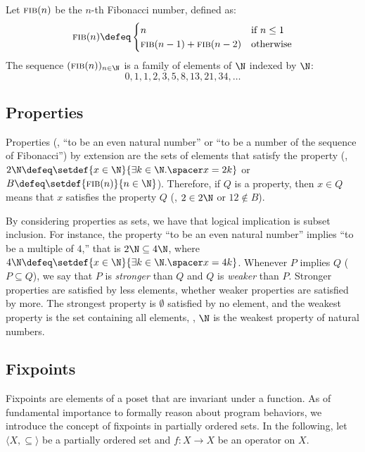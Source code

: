 \begin{example}
  Let $\textsc{fib}(n)$ be the $n$-th Fibonacci number, defined as:
  \begin{align*}
    \textsc{fib}(n) \defeq \begin{cases}
      n & \text{if } n \le 1 \\
      \textsc{fib}(n-1) + \textsc{fib}(n-2) & \text{otherwise}
    \end{cases}
  \end{align*}
  The sequence $(\textsc{fib}(n))_{n\in\N}$ is a family of elements of $\N$ indexed by $\N$:
  \[ 0, 1, 1, 2, 3, 5, 8, 13, 21, 34, \ldots \]
\end{example}

\subsection{Properties}

Properties (\eg, ``to be an even natural number'' or ``to be a number of the sequence of Fibonacci'') by extension are the sets of elements that satisfy the property (\eg, $2\N \defeq \setdef{x \in \N}{\exists k \in \N.\spacer x = 2k}$ or $B \defeq \setdef{\textsc{fib}(n)}{n\in\N}$). Therefore, if $Q$ is a property, then $x \in Q$ means that $x$ satisfies the property $Q$ (\eg, $2 \in 2\N$ or $12 \notin B$).

By considering properties as sets, we have that logical implication is subset inclusion. For instance, the property ``to be an even natural number'' implies ``to be a multiple of $4$,'' that is $2\N \subseteq 4\N$, where $4\N \defeq \setdef{x \in \N}{\exists k \in \N.\spacer x = 4k}$.
Whenever $P$ implies $Q$ ($P \subseteq Q$), we say that $P$ is \emph{stronger} than $Q$ and $Q$ is \emph{weaker} than $P$.
Stronger properties are satisfied by less elements, whether weaker properties are satisfied by more.
The strongest property is $\emptyset$ satisfied by no element, and the weakest property is the set containing all elements, \eg, $\N$ is the weakest property of natural numbers.


\subsection{Fixpoints}

Fixpoints are elements of a poset that are invariant under a function.
As of fundamental importance to formally reason about program behaviors, we introduce the concept of fixpoints in partially ordered sets.
In the following, let $\langle X, \subseteq \rangle$ be a partially ordered set and $f : X \to X$ be an operator on $X$.

